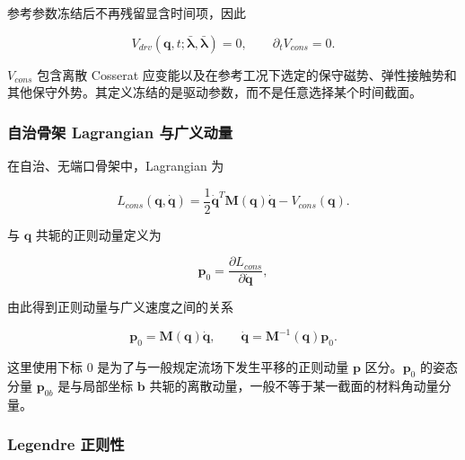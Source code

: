 参考参数冻结后不再残留显含时间项，因此

\begin{equation}
\label{eq:hamiltonian-3-7}
\boxed{V_{drv}\left( \mathbf{q},t;\bar{\bm{\lambda}},\bar{\bm{\lambda}} \right) = 0,\quad\quad\partial_{t}V_{cons} = 0.}
\end{equation}

\(V_{cons}\) 包含离散 Cosserat 应变能以及在参考工况下选定的保守磁势、弹性接触势和其他保守外势。其定义冻结的是驱动参数，而不是任意选择某个时间截面。

\subsubsection{自治骨架 Lagrangian 与广义动量}\label{sec:hamiltonian-3-2-2}

在自治、无端口骨架中，Lagrangian 为

\begin{equation}
\label{eq:hamiltonian-3-8}
\boxed{L_{cons}\left( \mathbf{q},\dot{\mathbf{q}} \right) = \frac{1}{2}{\dot{\mathbf{q}}}^{T}\mathbf{M}\left( \mathbf{q} \right)\dot{\mathbf{q}} - V_{cons}\left( \mathbf{q} \right).}
\end{equation}

与 \(\mathbf{q}\) 共轭的正则动量定义为\cite{MarsdenRatiu1999MechanicsSymmetry,Arnold1989ClassicalMechanics}

\begin{equation}
\label{eq:hamiltonian-3-9}
\mathbf{p}_{0} = \frac{\partial L_{cons}}{\partial\dot{\mathbf{q}}},
\end{equation}

由此得到正则动量与广义速度之间的关系

\begin{equation}
\label{eq:hamiltonian-3-10}
\boxed{\mathbf{p}_{0} = \mathbf{M}\left( \mathbf{q} \right)\dot{\mathbf{q}},\quad\quad\dot{\mathbf{q}} = \mathbf{M}^{- 1}\left( \mathbf{q} \right)\mathbf{p}_{0}.}
\end{equation}

这里使用下标 \(0\) 是为了与一般规定流场下发生平移的正则动量 \(\mathbf{p}\) 区分。\(\mathbf{p}_{0}\) 的姿态分量 \(\mathbf{p}_{0b}\) 是与局部坐标 \(\mathbf{b}\) 共轭的离散动量，一般不等于某一截面的材料角动量分量。

\subsubsection{Legendre 正则性}\label{sec:hamiltonian-3-2-3}

